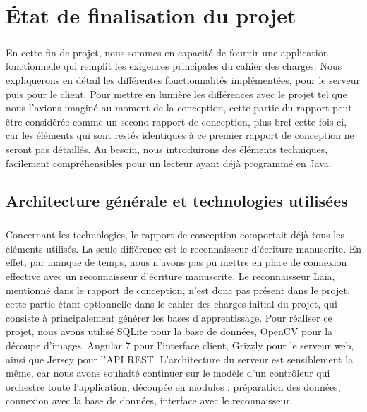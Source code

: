 \chapter{État de finalisation du projet}

\paragraph{}
En cette fin de projet, nous sommes en capacité de fournir une application fonctionnelle qui remplit les exigences principales du cahier des charges. Nous expliquerons en détail les différentes fonctionnalités implémentées, pour le serveur puis pour le client. Pour mettre en lumière les différences avec le projet tel que nous l'avions imaginé au moment de la conception, cette partie du rapport peut être considérée comme un second rapport de conception, plus bref cette fois-ci, car les éléments qui sont restés identiques à ce premier rapport de conception ne seront pas détaillés. Au besoin, nous introduirons des éléments techniques, facilement compréhensibles pour un lecteur ayant déjà programmé en Java.

\section{Architecture générale et technologies utilisées}

\paragraph{}
Concernant les technologies, le rapport de conception comportait déjà tous les éléments utilisés. La seule différence est le reconnaisseur d'écriture manuscrite. En effet, par manque de temps, nous n'avons pas pu mettre en place de connexion effective avec un reconnaisseur d'écriture manuscrite. Le reconnaisseur Laia, mentionné dans le rapport de conception, n'est donc pas présent dans le projet, cette partie étant optionnelle dans le cahier des charges initial du projet, qui consiste à principalement générer les bases d'apprentissage. 
Pour réaliser ce projet, nous avons utilisé SQLite pour la base de données, OpenCV pour la découpe d'images, Angular 7 pour l'interface client, Grizzly pour le serveur web, ainsi que Jersey pour l'API REST. L'architecture du serveur est sensiblement la même, car nous avons souhaité continuer sur le modèle d'un contrôleur qui orchestre toute l'application, découpée en modules : préparation des données, connexion avec la base de données, interface avec le reconnaisseur.

